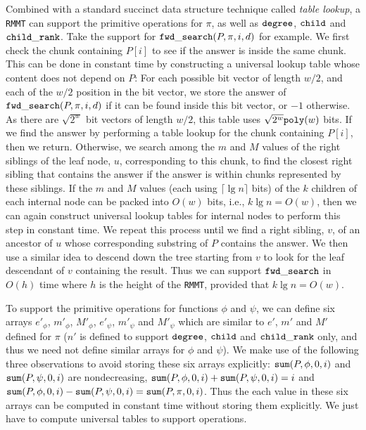 Combined with a standard succinct data structure technique called {\em table lookup}, a {\tt RMMT} can support the primitive operations for $\pi$, as well as $\mathtt{degree}$, $\mathtt{child}$ and $\mathtt{child\_rank}$. 
Take the support for $\mathtt{fwd\_search}(P,\pi,i,d)$ for example. 
We first check the chunk containing $P[i]$ to see if the answer is inside the same chunk. 
This can be done in constant time by constructing a universal lookup table whose content does not depend on $P$: For each possible bit vector of length $w/2$, and each of the $w/2$ position in the bit vector, we store the answer of $\mathtt{fwd\_search}(P,\pi,i,d)$ if it can be found inside this bit vector, or $-1$ otherwise. As there are $\sqrt{2^w}$ bit vectors of length $w/2$, this table uses $\sqrt{2^w}\mathtt{poly}(w)$ bits. 
If we find the  answer by performing a table lookup for the chunk containing $P[i]$, then we return. 
Otherwise, we search among the $m$ and $M$ values of the right siblings of the leaf node, $u$, corresponding to this chunk, to find the closest right sibling that contains the answer if the answer is within chunks represented by these siblings. 
If the $m$ and $M$ values (each using $\lceil\lg n\rceil$ bits) of the $k$ children of each internal node can be packed into $O(w)$ bits, i.e., $k \lg n = O(w)$, then we can again construct universal lookup tables for internal nodes to perform this step in constant time. 
We repeat this process until we find a right sibling, $v$, of an ancestor of $u$ whose corresponding substring of $P$ contains the answer. 
We then use a similar idea to descend down the tree starting from $v$ to look for the leaf descendant of $v$ containing the result. 
Thus we can support $\mathtt{fwd\_search}$ in $O(h)$ time where $h$ is the height of the {\tt RMMT}, provided that $k \lg n = O(w)$. 

To support the primitive operations for functions $\phi$ and $\psi$, we can define six arrays $e'_{\phi}$, $m'_{\phi}$, $M'_{\phi}$, $e'_{\psi}$, $m'_{\psi}$ and $M'_{\psi}$ which are similar to $e'$, $m'$ and $M'$ defined for $\pi$ ($n'$ is defined to support $\mathtt{degree}$, $\mathtt{child}$ and $\mathtt{child\_rank}$ only, and thus we need not define similar arrays for $\phi$ and $\psi$). 
We make use of the following three observations to avoid storing these six arrays explicitly: $\mathtt{sum}(P, \phi, 0, i)$ and $\mathtt{sum}(P, \psi, 0, i)$ are nondecreasing, $\mathtt{sum}(P, \phi, 0, i) + \mathtt{sum}(P, \psi, 0, i) = i$ and $\mathtt{sum}(P, \phi, 0, i) - \mathtt{sum}(P, \psi, 0, i) = \mathtt{sum}(P, \pi, 0, i)$. 
Thus the each value in these six arrays can be computed in constant time without storing them explicitly. 
We just have to compute universal tables to support operations. 


